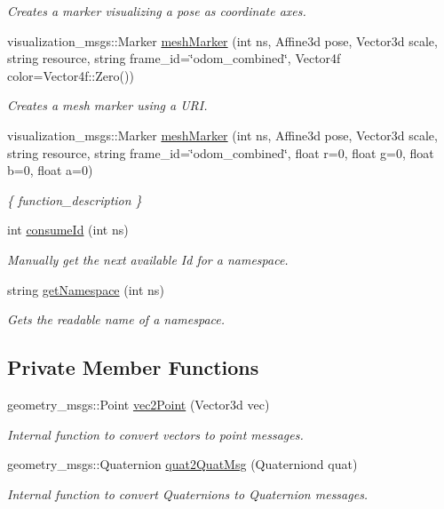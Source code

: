 \begin{DoxyCompactItemize}
\begin{DoxyCompactList}\small\item\em Creates a marker visualizing a pose as coordinate axes. \end{DoxyCompactList}\item 
visualization\-\_\-msgs\-::\-Marker \hyperlink{classVisualizationManager_a53193705b968d8ef4bc87ca7b44ba597}{mesh\-Marker} (int ns, Affine3d pose, Vector3d scale, string resource, string frame\-\_\-id=\char`\"{}odom\-\_\-combined\char`\"{}, Vector4f color=Vector4f\-::\-Zero())
\begin{DoxyCompactList}\small\item\em Creates a mesh marker using a U\-R\-I. \end{DoxyCompactList}\item 
visualization\-\_\-msgs\-::\-Marker \hyperlink{classVisualizationManager_aa6726def2fb09cfd32517eb474693046}{mesh\-Marker} (int ns, Affine3d pose, Vector3d scale, string resource, string frame\-\_\-id=\char`\"{}odom\-\_\-combined\char`\"{}, float r=0, float g=0, float b=0, float a=0)
\begin{DoxyCompactList}\small\item\em \{ function\-\_\-description \} \end{DoxyCompactList}\item 
int \hyperlink{classVisualizationManager_ab5f80d32ca698923cce675d79289c262}{consume\-Id} (int ns)
\begin{DoxyCompactList}\small\item\em Manually get the next available Id for a namespace. \end{DoxyCompactList}\item 
string \hyperlink{classVisualizationManager_a5d0d1765b3f64a3a542ca93c46674ce3}{get\-Namespace} (int ns)
\begin{DoxyCompactList}\small\item\em Gets the readable name of a namespace. \end{DoxyCompactList}\end{DoxyCompactItemize}
\subsection*{Private Member Functions}
\begin{DoxyCompactItemize}
\item 
geometry\-\_\-msgs\-::\-Point \hyperlink{classVisualizationManager_aeeccb0e2791c358741fa5124535141e5}{vec2\-Point} (Vector3d vec)
\begin{DoxyCompactList}\small\item\em Internal function to convert vectors to point messages. \end{DoxyCompactList}\item 
geometry\-\_\-msgs\-::\-Quaternion \hyperlink{classVisualizationManager_a0477cd745c1b09d67dbe2b850bd52e46}{quat2\-Quat\-Msg} (Quaterniond quat)
\begin{DoxyCompactList}\small\item\em Internal function to convert Quaternions to Quaternion messages. \end{DoxyCompactList}\end{DoxyCompactItemize}
